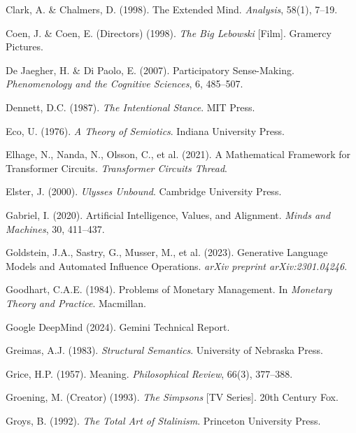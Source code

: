 \documentclass[12pt]{article}
\begin{document}
\begin{thebibliography}{99}
Clark, A. \& Chalmers, D. (1998). The Extended Mind. \textit{Analysis}, 58(1), 7–19.

Coen, J. \& Coen, E. (Directors) (1998). \textit{The Big Lebowski} [Film]. Gramercy Pictures.

De Jaegher, H. \& Di Paolo, E. (2007). Participatory Sense-Making. \textit{Phenomenology and the Cognitive Sciences}, 6, 485–507.

Dennett, D.C. (1987). \textit{The Intentional Stance}. MIT Press.

Eco, U. (1976). \textit{A Theory of Semiotics}. Indiana University Press.

Elhage, N., Nanda, N., Olsson, C., et al. (2021). A Mathematical Framework for Transformer Circuits. \textit{Transformer Circuits Thread}.

Elster, J. (2000). \textit{Ulysses Unbound}. Cambridge University Press.

Gabriel, I. (2020). Artificial Intelligence, Values, and Alignment. \textit{Minds and Machines}, 30, 411–437.

Goldstein, J.A., Sastry, G., Musser, M., et al. (2023). Generative Language Models and Automated Influence Operations. \textit{arXiv preprint arXiv:2301.04246}.

Goodhart, C.A.E. (1984). Problems of Monetary Management. In \textit{Monetary Theory and Practice}. Macmillan.

Google DeepMind (2024). Gemini Technical Report.

Greimas, A.J. (1983). \textit{Structural Semantics}. University of Nebraska Press.

Grice, H.P. (1957). Meaning. \textit{Philosophical Review}, 66(3), 377–388.

Groening, M. (Creator) (1993). \textit{The Simpsons} [TV Series]. 20th Century Fox.

Groys, B. (1992). \textit{The Total Art of Stalinism}. Princeton University Press.


\end{thebibliography}
\end{document}
